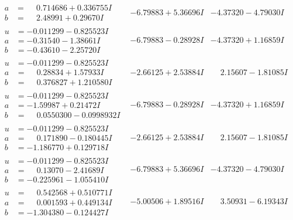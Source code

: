 \documentclass[1p]{elsarticle_modified}
\theoremstyle{definition}
\begin{document}
$$\begin{array}{c|c|c}
\begin{aligned}
a &= \phantom{-}0.714686 + 0.336755 I \\
b &= \phantom{-}2.48991 + 0.29670 I\end{aligned}
 & -6.79883 + 5.36696 I & -4.37320 - 4.79030 I \\ \hline\begin{aligned}
u &= -0.011299 - 0.825523 I \\
a &= -0.31540 - 1.38661 I \\
b &= -0.43610 - 2.25720 I\end{aligned}
 & -6.79883 - 0.28928 I & -4.37320 + 1.16859 I \\ \hline\begin{aligned}
u &= -0.011299 - 0.825523 I \\
a &= \phantom{-}0.28834 + 1.57933 I \\
b &= \phantom{-}0.376827 + 1.210580 I\end{aligned}
 & -2.66125 + 2.53884 I & \phantom{-}2.15607 - 1.81085 I \\ \hline\begin{aligned}
u &= -0.011299 - 0.825523 I \\
a &= -1.59987 + 0.21472 I \\
b &= \phantom{-}0.0550300 - 0.0998932 I\end{aligned}
 & -6.79883 - 0.28928 I & -4.37320 + 1.16859 I \\ \hline\begin{aligned}
u &= -0.011299 - 0.825523 I \\
a &= \phantom{-}0.171890 - 0.180445 I \\
b &= -1.186770 + 0.129718 I\end{aligned}
 & -2.66125 + 2.53884 I & \phantom{-}2.15607 - 1.81085 I \\ \hline\begin{aligned}
u &= -0.011299 - 0.825523 I \\
a &= \phantom{-}0.13070 - 2.41689 I \\
b &= -0.225961 - 1.055410 I\end{aligned}
 & -6.79883 + 5.36696 I & -4.37320 - 4.79030 I \\ \hline\begin{aligned}
u &= \phantom{-}0.542568 + 0.510771 I \\
a &= \phantom{-}0.001593 + 0.449134 I \\
b &= -1.304380 - 0.124427 I\end{aligned}
 & -5.00506 + 1.89516 I & \phantom{-}3.50931 - 6.19343 I \\ \hline\begin{aligned}

\end{aligned}
\end{array}$$
\end{document}
